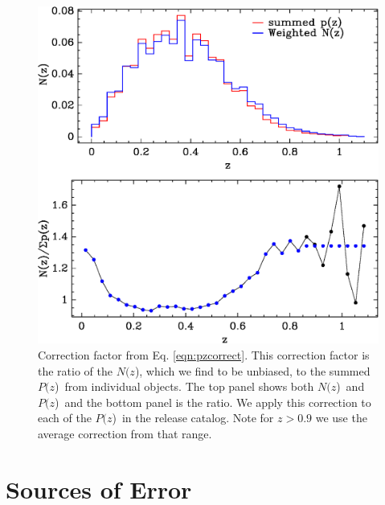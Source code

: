 \documentclass[preprint]{aastex}
\newcommand{\pofz}{$P(z$)}
\newcommand{\Nofz}{$N(z$)}
\begin{document}
\begin{figure}[t]\centering
    \includegraphics[scale=0.6]{figures/pofz-correct-12.eps}

    \caption{Correction factor from Eq. \ref{eqn:pzcorrect}.  This correction
    factor is the ratio of the \Nofz, which we find to be unbiased, to the summed
    \pofz\ from individual objects. The top panel shows both \Nofz\ and \pofz\
    and the bottom panel is the ratio.  We apply this correction to each of the
    \pofz\ in the release catalog.  Note for $z > 0.9$ we use the average
    correction from that range.}

    \label{fig:pzcorr}
    \vspace{2em}
\end{figure}



\section{Sources of Error} \label{sec:errors}
\end{document}
